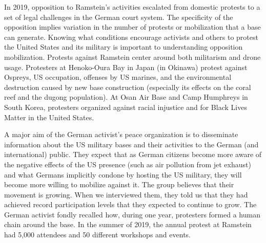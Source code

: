 In 2019, opposition to Ramstein's activities escalated from domestic protests to a set of legal challenges in the German court system.\cite{Kloeckner2019,Reuters2019} The specificity of the opposition implies variation in the number of protests or mobilization that a base can generate. Knowing what conditions encourage activists and others to protest the United States and its military is important to understanding opposition mobilization.  Protests against Ramstein center around both militarism and drone usage. Protesters at Henoko-Oura Bay in Japan (in Okinawa) protest against Ospreys, US occupation, offenses by US marines, and the environmental destruction caused by new base construction (especially its effects on the coral reef and the dugong population).\cite{Hibbett2019} At Osan Air Base and Camp Humphreys in South Korea, protesters organized against racial injustice and for Black Lives Matter in the United States.\cite{Sisk2020}
		
		A major aim of the German activist's peace organization is to disseminate information about the US military bases and their activities to the German (and international) public. They expect that as German citizens become more aware of the negative effects of the US presence (such as air pollution from jet exhaust) and what Germans implicitly condone by hosting the US military, they will become more willing to mobilize against it. The group believes that their movement is growing. When we interviewed them, they told us that they had achieved record participation levels that they expected to continue to grow. The German activist fondly recalled how, during one year, protesters formed a human chain around the base. In the summer of 2019, the annual protest at Ramstein had 5,000 attendees and 50 different workshops and events.  
		

